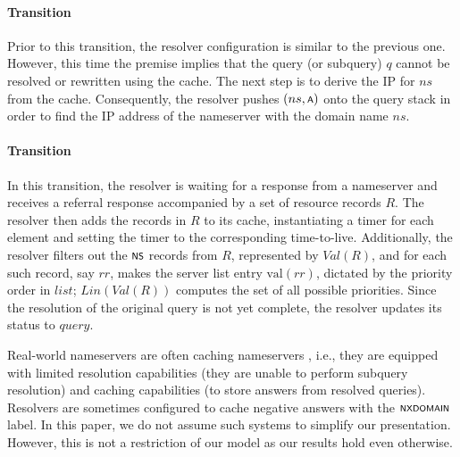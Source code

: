 \paragraph{Transition }
Prior to this transition, the resolver configuration is similar to the previous one. However, this time the premise implies that the query (or subquery) $q$ cannot be resolved or rewritten using the cache. The next step is to derive the IP for $ns$ from the cache. Consequently, the resolver pushes $(ns,\scrsf{a})$ onto the query stack in order to find the IP address of the nameserver with the domain name $ns$.

\paragraph{Transition }
In this transition, the resolver is waiting for a response from a nameserver and receives a referral response accompanied by a set of resource records $R$. The resolver then adds the records in $R$ to its cache, instantiating a timer for each element and setting the timer to the corresponding time-to-live. Additionally, the resolver filters out the $\scrsf{ns}$ records from $R$, represented by $\mathit{Val}(R)$, and for each such record, say $rr$, makes the server list entry $\text{val}(rr)$, dictated by the priority order in $list$; $\mathit{Lin}(\mathit{Val}(R))$ computes the set of all possible priorities. Since the resolution of the original query is not yet complete, the resolver updates its status to $\mathit{query}$.




\begin{rem}
	Real-world nameservers are often caching nameservers \cite{rfc1034,rfc1035}, i.e., they are equipped with limited resolution capabilities (they are unable to perform subquery resolution) and caching capabilities (to store answers from resolved queries). Resolvers are sometimes configured to cache negative answers with the $\scrsf{nxdomain}$ label. In this paper, we do not assume such systems to simplify our presentation. However, this is not a restriction of our model as our results hold even otherwise.
\end{rem}


